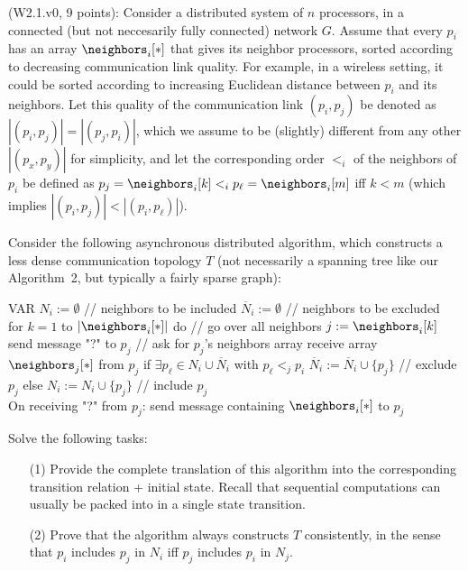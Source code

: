 \begin{Exc}{(W2.1.v0, 9 points):}
Consider a distributed system of $n$ processors, in a
connected (but not neccesarily fully connected) network $G$.
Assume that every $p_i$ has
an array $\neighbors_i[*]$ that gives its neighbor processors,
sorted according to decreasing communication link quality.
For example, in a wireless setting, it could be sorted according
to increasing Euclidean distance between $p_i$ and its neighbors.
Let this quality of the communication link $(p_i,p_j)$ be
denoted as $|(p_i,p_j)|=|(p_j,p_i)|$, which we assume to be (slightly)
different from any other $|(p_x,p_y)|$ for simplicity, and let
the corresponding order $<_i$
of the neighbors of $p_i$ be defined as
$p_j=\neighbors_i[k] <_i p_\ell=\neighbors_i[m]$ iff $k<m$ (which
implies $|(p_i,p_j)|<|(p_i,p_\ell)|$).

Consider the following asynchronous distributed algorithm, which constructs
a less dense communication topology $T$ (not necessarily a spanning
tree like our Algorithm~2, but typically a fairly sparse graph):

\begin{code}%
\vspace*{-1cm}%
\NL
{}\NL
VAR $N_i := \emptyset$ // neighbors to be included\NL
\> $\overline{N}_i := \emptyset$ // neighbors to be excluded\\
\NL
for $k=1$ to $|\neighbors_i[*]|$ do // go over all neighbors\NL
\> $j := \neighbors_i[k]$\NL
\> send message "?" to $p_j$ // ask for $p_j$'s neighbors array\NL
\> receive array $\neighbors_j[*]$ from $p_j$\NL
\> if $\exists p_\ell \in N_i \cup \overline{N}_i$ with $p_\ell <_j p_i$\NL
\>\> $\overline{N}_i := \overline{N}_i \cup \{p_j\}$ // exclude $p_j$\NL
\> else\NL
\>\> $N_i := N_i \cup \{p_j\}$ // include $p_j$\\
\NL
On receiving "?" from $p_j$:\NL
\> send message containing $\neighbors_i[*]$ to $p_j$
\end{code}

Solve the following tasks:
\begin{enumerate}
\item[(1)] Provide the complete translation of this algorithm into the corresponding
transition relation + initial state. Recall that sequential computations can
usually be packed into in a single state transition.

\item[(2)] Prove that the algorithm always constructs $T$ consistently, in
the sense that $p_i$ includes $p_j$ in $N_i$ iff $p_j$ includes $p_i$
in $N_j$.


\end{enumerate}
\end{Exc}
